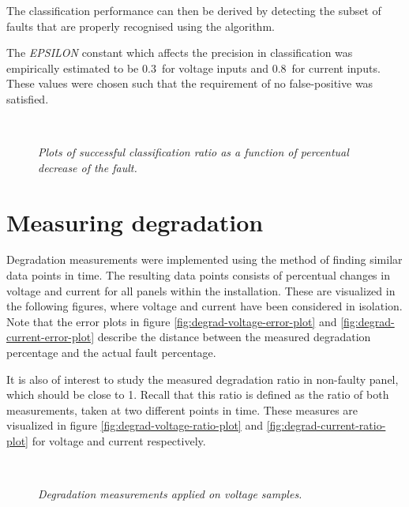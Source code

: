 The classification performance can then be derived by detecting the subset of faults that are properly recognised using the algorithm.

The \emph{EPSILON} constant which affects the precision in classification was empirically estimated to be $0.3$ for voltage inputs and $0.8$ for current inputs.
These values were chosen such that the requirement of no false-positive was satisfied.

\begin{figure}[here]
\centering
{}
~
\caption[Immediate failure detection performance]{\emph{
   Plots of successful classification ratio as a function of percentual decrease of the fault.
}}
\end{figure}

\clearpage
\section{Measuring degradation}
Degradation measurements were implemented using the method of finding similar data points in time.
The resulting data points consists of percentual changes in voltage and current for all panels within the installation.
These are visualized in the following figures, where voltage and current have been considered in isolation.
Note that the error plots in figure \ref{fig:degrad-voltage-error-plot} and \ref{fig:degrad-current-error-plot} describe the distance between the measured degradation percentage and the actual fault percentage.

It is also of interest to study the measured degradation ratio in non-faulty panel, which should be close to 1.
Recall that this ratio is defined as the ratio of both measurements, taken at two different points in time.
These measures are visualized in figure \ref{fig:degrad-voltage-ratio-plot} and \ref{fig:degrad-current-ratio-plot} for voltage and current respectively.

\begin{figure}[here]
\centering
{}
~
\caption[Performance of distance-based method (voltage)]{\emph{Degradation measurements applied on voltage samples.}}
\end{figure}

